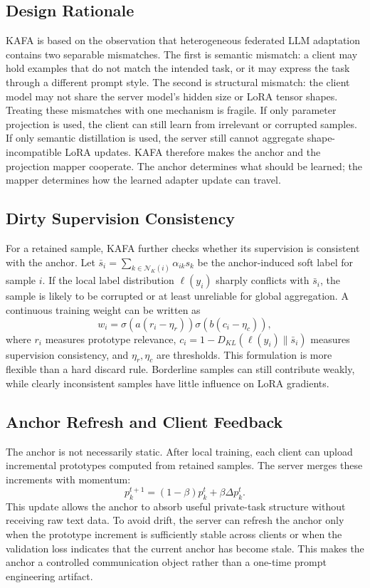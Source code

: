 \documentclass[conference]{IEEEtran}
\begin{document}
\subsection{Design Rationale}
KAFA is based on the observation that heterogeneous federated LLM adaptation contains two separable mismatches. The first is semantic mismatch: a client may hold examples that do not match the intended task, or it may express the task through a different prompt style. The second is structural mismatch: the client model may not share the server model's hidden size or LoRA tensor shapes. Treating these mismatches with one mechanism is fragile. If only parameter projection is used, the client can still learn from irrelevant or corrupted samples. If only semantic distillation is used, the server still cannot aggregate shape-incompatible LoRA updates. KAFA therefore makes the anchor and the projection mapper cooperate. The anchor determines what should be learned; the mapper determines how the learned adapter update can travel.

\subsection{Dirty Supervision Consistency}
For a retained sample, KAFA further checks whether its supervision is consistent with the anchor. Let $\bar{s}_i=\sum_{k\in\mathcal{N}_K(i)}\alpha_{ik}s_k$ be the anchor-induced soft label for sample $i$. If the local label distribution $\ell(y_i)$ sharply conflicts with $\bar{s}_i$, the sample is likely to be corrupted or at least unreliable for global aggregation. A continuous training weight can be written as
\begin{equation}
w_i=\sigma(a(r_i-\eta_r))\sigma(b(c_i-\eta_c)),
\end{equation}
where $r_i$ measures prototype relevance, $c_i=1-D_{KL}(\ell(y_i)\|\bar{s}_i)$ measures supervision consistency, and $\eta_r,\eta_c$ are thresholds. This formulation is more flexible than a hard discard rule. Borderline samples can still contribute weakly, while clearly inconsistent samples have little influence on LoRA gradients.

\subsection{Anchor Refresh and Client Feedback}
The anchor is not necessarily static. After local training, each client can upload incremental prototypes computed from retained samples. The server merges these increments with momentum:
\begin{equation}
p_k^{t+1}=(1-\beta)p_k^t+\beta\Delta p_k^t.
\end{equation}
This update allows the anchor to absorb useful private-task structure without receiving raw text data. To avoid drift, the server can refresh the anchor only when the prototype increment is sufficiently stable across clients or when the validation loss indicates that the current anchor has become stale. This makes the anchor a controlled communication object rather than a one-time prompt engineering artifact.
\end{document}
